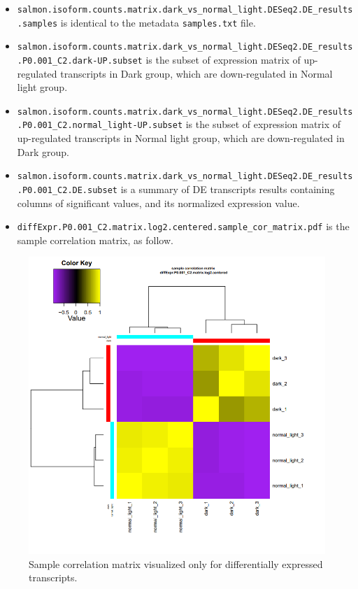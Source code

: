 \documentclass[
  letterpaper,
  DIV=11,
  numbers=noendperiod]{scrreprt}
\begin{document}
\begin{itemize}
\item
  \texttt{salmon.isoform.counts.matrix.dark\_vs\_normal\_light.DESeq2.DE\_results.samples}
  is identical to the metadata \texttt{samples.txt} file.
\item
  \texttt{salmon.isoform.counts.matrix.dark\_vs\_normal\_light.DESeq2.DE\_results.P0.001\_C2.dark-UP.subset}
  is the subset of expression matrix of up-regulated transcripts in Dark
  group, which are down-regulated in Normal light group.
\item
  \texttt{salmon.isoform.counts.matrix.dark\_vs\_normal\_light.DESeq2.DE\_results.P0.001\_C2.normal\_light-UP.subset}
  is the subset of expression matrix of up-regulated transcripts in
  Normal light group, which are down-regulated in Dark group.
\item
  \texttt{salmon.isoform.counts.matrix.dark\_vs\_normal\_light.DESeq2.DE\_results.P0.001\_C2.DE.subset}
  is a summary of DE transcripts results containing columns of
  significant values, and its normalized expression value.
\item
  \texttt{diffExpr.P0.001\_C2.matrix.log2.centered.sample\_cor\_matrix.pdf}
  is the sample correlation matrix, as follow.
\end{itemize}

\begin{figure}

{\centering \includegraphics{assets/35_DE_sample_cor.png}

}

\caption{Sample correlation matrix visualized only for differentially
expressed transcripts.}

\end{figure}
\end{document}
